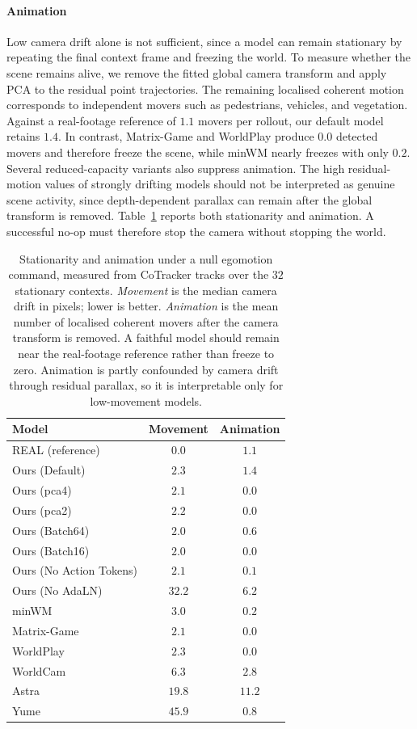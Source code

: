 \paragraph{Animation}
Low camera drift alone is not sufficient, since a model can remain stationary
by repeating the final context frame and freezing the world. To measure whether
the scene remains alive, we remove the fitted global camera transform and apply
PCA to the residual point trajectories. The remaining localised coherent motion
corresponds to independent movers such as pedestrians, vehicles, and
vegetation. Against a real-footage reference of $1.1$ movers per rollout, our
default model retains $1.4$. In contrast, Matrix-Game and WorldPlay produce
$0.0$ detected movers and therefore freeze the scene, while minWM nearly
freezes with only $0.2$. Several reduced-capacity variants also suppress
animation. The high residual-motion values of strongly drifting models should
not be interpreted as genuine scene activity, since depth-dependent parallax
can remain after the global transform is removed. Table~\ref{tab:anim} reports
both stationarity and animation. A successful no-op must therefore stop the
camera without stopping the world.
\begin{table}[t]
\centering
{
\small
\begin{tabular}{lcc}
\toprule
Model & Movement & Animation \\
\midrule
REAL (reference)        & $0.0$  & $1.1$  \\
\midrule
Ours (Default)          & $2.3$  & $1.4$  \\
Ours (pca4)             & $2.1$  & $0.0$  \\
Ours (pca2)             & $2.2$  & $0.0$  \\
Ours (Batch64)          & $2.0$  & $0.6$  \\
Ours (Batch16)          & $2.0$  & $0.0$  \\
Ours (No Action Tokens) & $2.1$  & $0.1$  \\
Ours (No AdaLN)         & $32.2$ & $6.2$  \\
\midrule
minWM                   & $3.0$  & $0.2$  \\
Matrix-Game             & $2.1$  & $0.0$  \\
WorldPlay               & $2.3$  & $0.0$  \\
WorldCam                & $6.3$  & $2.8$  \\
Astra                   & $19.8$ & $11.2$ \\
Yume                    & $45.9$ & $0.8$  \\
\bottomrule
\end{tabular}
}
\caption{
    Stationarity and animation under a null egomotion command, measured from
    CoTracker tracks over the $32$ stationary contexts. \emph{Movement} is the
    median camera drift in pixels; lower is better. \emph{Animation} is the mean
    number of localised coherent movers after the camera transform is removed.
    A faithful model should remain near the real-footage reference rather than
    freeze to zero. Animation is partly confounded by camera drift through
    residual parallax, so it is interpretable only for low-movement models.
}
\label{tab:anim}
\end{table}


